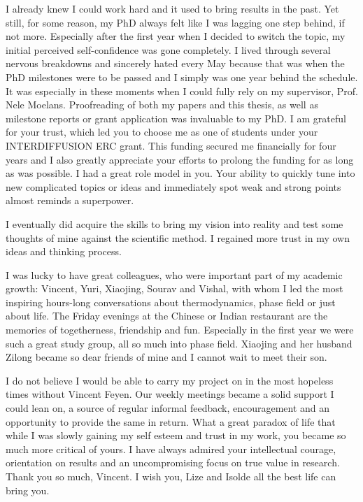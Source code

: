 I already knew I could work hard and it used to bring results in the past. Yet still, for some reason, my PhD always felt like I was lagging one step behind, if not more. Especially after the first year when I decided to switch the topic, my initial perceived self-confidence was gone completely. I lived through several nervous breakdowns and sincerely hated every May because that was when the PhD milestones were to be passed and I simply was one year behind the schedule. It was especially in these moments when I could fully rely on my supervisor, Prof. Nele Moelans. Proofreading of both my papers and this thesis, as well as milestone reports or grant application was invaluable to my PhD. I am grateful for your trust, which led you to choose me as one of students under your INTERDIFFUSION ERC grant. This funding secured me financially for four years and I also greatly appreciate your efforts to prolong the funding for as long as was possible. I had a great role model in you. Your ability to quickly tune into new complicated topics or ideas and immediately spot weak and strong points almost reminds a superpower. 

I eventually did acquire the skills to bring my vision into reality and test some thoughts of mine against the scientific method. I regained more trust in my own ideas and thinking process.

I was lucky to have great colleagues, who were important part of my academic growth: Vincent, Yuri, Xiaojing, Sourav and Vishal, with whom I led the most inspiring hours-long conversations about thermodynamics, phase field or just about life. The Friday evenings at the Chinese or Indian restaurant are the memories of togetherness, friendship and fun. Especially in the first year we were such a great study group, all so much into phase field. Xiaojing and her husband Zilong became so dear friends of mine and I cannot wait to meet their son.

I do not believe I would be able to carry my project on in the most hopeless times without Vincent Feyen. Our weekly meetings became a solid support I could lean on, a source of regular informal feedback, encouragement and an opportunity to provide the same in return. What a great paradox of life that while I was slowly gaining my self esteem and trust in my work, you became so much more critical of yours. I have always admired your intellectual courage, orientation on results and an uncompromising focus on true value in research. Thank you so much, Vincent. I wish you, Lize and Isolde all the best life can bring you. 

